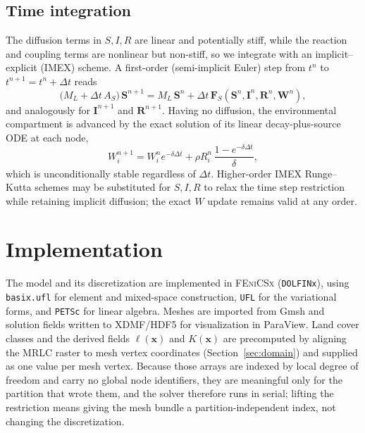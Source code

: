 \documentclass[11pt]{article}
\begin{document}
\subsection{Time integration}

The diffusion terms in $S,I,R$ are linear and potentially stiff, while the reaction and coupling terms are nonlinear but non-stiff, so we integrate with an implicit--explicit (IMEX) scheme. A first-order (semi-implicit Euler) step from $t^n$ to $t^{n+1}=t^n+\Delta t$ reads
\begin{equation}
\big(M_L + \Delta t\,A_S\big)\,\mathbf{S}^{n+1} = M_L\,\mathbf{S}^n + \Delta t\,\mathbf{F}_S(\mathbf{S}^n,\mathbf{I}^n,\mathbf{R}^n,\mathbf{W}^n),
\label{eq:imex}
\end{equation}
and analogously for $\mathbf{I}^{n+1}$ and $\mathbf{R}^{n+1}$. Having no diffusion, the environmental compartment is advanced by the exact solution of its linear decay-plus-source ODE at each node,
\begin{equation}
W_i^{n+1} = W_i^n e^{-\delta \Delta t} + \rho R_i^n\,\frac{1-e^{-\delta\Delta t}}{\delta},
\end{equation}
which is unconditionally stable regardless of $\Delta t$. Higher-order IMEX Runge--Kutta schemes may be substituted for $S,I,R$ to relax the time step restriction while retaining implicit diffusion; the exact $W$ update remains valid at any order.

\section{Implementation}
\label{sec:implementation}

The model and its discretization are implemented in \textsc{FEniCSx} (\texttt{DOLFINx}), using \texttt{basix.ufl} for element and mixed-space construction, \texttt{UFL} for the variational forms, and \texttt{PETSc} for linear algebra. Meshes are imported from Gmsh and solution fields written to XDMF/HDF5 for visualization in ParaView. Land cover classes and the derived fields $\ell(\mathbf{x})$ and $K(\mathbf{x})$ are precomputed by aligning the MRLC raster to mesh vertex coordinates (Section~\ref{sec:domain}) and supplied as one value per mesh vertex. Because those arrays are indexed by local degree of freedom and carry no global node identifiers, they are meaningful only for the partition that wrote them, and the solver therefore runs in serial; lifting the restriction means giving the mesh bundle a partition-independent index, not changing the discretization.
\end{document}
